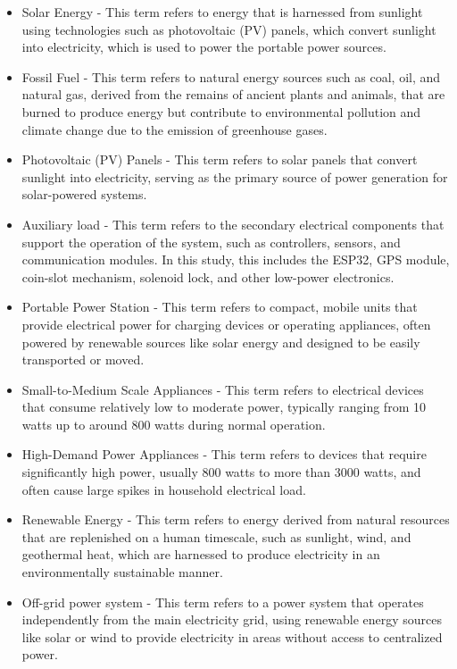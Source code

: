 {\begin{itemize}
	\item Solar Energy - This term refers to energy that is harnessed from sunlight using technologies such as photovoltaic (PV) panels, which convert sunlight into electricity, which is used to power the portable power sources.
	
	\item Fossil Fuel - This term refers to natural energy sources such as coal, oil, and natural gas, derived from the remains of ancient plants and animals, that are burned to produce energy but contribute to environmental pollution and climate change due to the emission of greenhouse gases.
	
	\item Photovoltaic (PV) Panels - This term refers to solar panels that convert sunlight into electricity, serving as the primary source of power generation for solar-powered systems.
	
	\item Auxiliary load - This term refers to the secondary electrical components that support the operation of the system, such as controllers, sensors, and communication modules. In this study, this includes the ESP32, GPS module, coin-slot mechanism, solenoid lock, and other low-power electronics.
	
	\item Portable Power Station - This term refers to compact, mobile units that provide electrical power for charging devices or operating appliances, often powered by renewable sources like solar energy and designed to be easily transported or moved.
	
	\item Small-to-Medium Scale Appliances - This term refers to electrical devices that consume relatively low to moderate power, typically ranging from 10 watts up to around 800 watts during normal operation.
	
	\item High-Demand Power Appliances - This term refers to devices that require significantly high power, usually 800 watts to more than 3000 watts, and often cause large spikes in household electrical load.
	
	\item Renewable Energy - This term refers to energy derived from natural resources that are replenished on a human timescale, such as sunlight, wind, and geothermal heat, which are harnessed to produce electricity in an environmentally sustainable manner.
	
	\item Off-grid power system - This term refers to a power system that operates independently from the main electricity grid, using renewable energy sources like solar or wind to provide electricity in areas without access to centralized power.
	

\end{itemize}}
